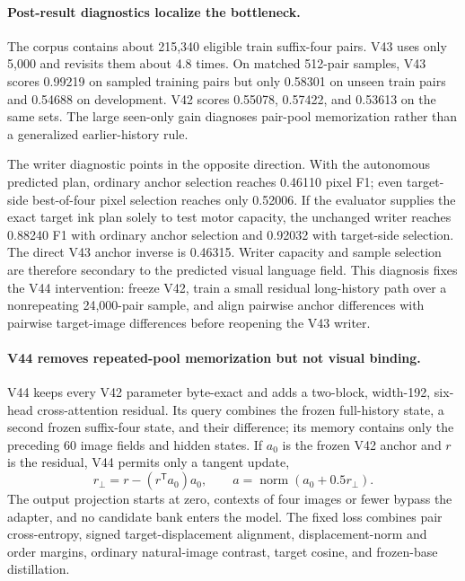 \documentclass[11pt]{article}
\begin{document}
\paragraph{Post-result diagnostics localize the bottleneck.}
The corpus contains about 215,340 eligible train suffix-four pairs. V43 uses
only 5,000 and revisits them about 4.8 times. On matched 512-pair samples, V43
scores 0.99219 on sampled training pairs but only 0.58301 on unseen train pairs
and 0.54688 on development. V42 scores 0.55078, 0.57422, and 0.53613 on the
same sets. The large seen-only gain diagnoses pair-pool memorization rather
than a generalized earlier-history rule.

The writer diagnostic points in the opposite direction. With the autonomous
predicted plan, ordinary anchor selection reaches 0.46110 pixel F1; even
target-side best-of-four pixel selection reaches only 0.52006. If the evaluator
supplies the exact target ink plan solely to test motor capacity, the unchanged
writer reaches 0.88240 F1 with ordinary anchor selection and 0.92032 with
target-side selection. The direct V43 anchor inverse is 0.46315. Writer
capacity and sample selection are therefore secondary to the predicted visual
language field. This diagnosis fixes the V44 intervention: freeze V42, train a
small residual long-history path over a nonrepeating 24,000-pair sample, and
align pairwise anchor differences with pairwise target-image differences before
reopening the V43 writer.

\paragraph{V44 removes repeated-pool memorization but not visual binding.}
V44 keeps every V42 parameter byte-exact and adds a two-block, width-192,
six-head cross-attention residual. Its query combines the frozen full-history
state, a second frozen suffix-four state, and their difference; its memory
contains only the preceding 60 image fields and hidden states. If $a_0$ is the
frozen V42 anchor and $r$ is the residual, V44 permits only a tangent update,
\[
r_{\perp}=r-(r^\mathsf{T}a_0)a_0,\qquad
a=\operatorname{norm}(a_0+0.5r_{\perp}).
\]
The output projection starts at zero, contexts of four images or fewer bypass
the adapter, and no candidate bank enters the model. The fixed loss combines
pair cross-entropy, signed target-displacement alignment, displacement-norm and
order margins, ordinary natural-image contrast, target cosine, and frozen-base
distillation.
\end{document}

